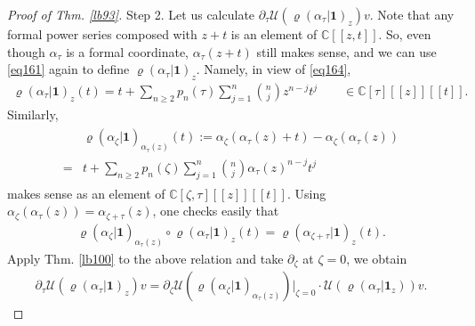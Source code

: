 \documentclass[12pt,a4paper,notitlepage]{article}
\theoremstyle{definition}
\theoremstyle{plain}
\newcommand{\mc}{\mathcal}
\newcommand{\id}{\mathbf{1}}
\newcommand{\Cbb}{\mathbb C}
\numberwithin{equation}{section}
\begin{document}
\begin{proof}[Proof of Thm. \ref{lb93}]
Step 2. Let us calculate $\partial_\tau \mc U(\varrho(\alpha_\tau|\id)_z)v$. Note that any formal power series composed with $z+t$ is an element of $\Cbb[[z,t]]$. So, even though $\alpha_\tau$ is a formal coordinate, $\alpha_\tau(z+t)$ still makes sense, and we can use \eqref{eq161} again to define $\varrho(\alpha_\tau|\id)_z$. Namely, in view of \eqref{eq164},
\begin{align*}
\varrho(\alpha_\tau|\id)_z(t)=t+\sum_{n\geq 2}p_n(\tau)\sum_{j=1}^n{n\choose j}z^{n-j}t^j\qquad \in\Cbb[\tau][[z]][[t]].	
\end{align*}
Similarly, 
\begin{align}\label{eq171}
	\begin{aligned}
&\varrho(\alpha_\zeta|\id)_{\alpha_\tau(z)}(t):=\alpha_\zeta(\alpha_\tau(z)+t)-\alpha_\zeta(\alpha_\tau(z))	\\
=&t+\sum_{n\geq 2}p_n(\zeta)\sum_{j=1}^n{n\choose j}\alpha_\tau(z)^{n-j}t^j
	\end{aligned}
\end{align}
makes sense as an element of $\Cbb[\zeta,\tau][[z]][[t]]$. Using $\alpha_\zeta(\alpha_\tau(z))=\alpha_{\zeta+\tau}(z)$, one checks easily that
\begin{align*}
\varrho(\alpha_\zeta|\id)_{\alpha_\tau(z)}\circ \varrho(\alpha_\tau|\id)_z(t)=\varrho(\alpha_{\zeta+\tau}|\id)_z(t).	
\end{align*}
Apply Thm. \ref{lb100} to the above relation and take $\partial_\zeta$ at $\zeta=0$, we obtain
\begin{align}
\partial_\tau \mc U(\varrho(\alpha_\tau|\id)_z)v=\partial_\zeta\mc U(\varrho(\alpha_\zeta|\id)_{\alpha_\tau(z)})\big|_{\zeta=0}\cdot \mc U(\varrho(\alpha_\tau|\id_z))v.	
\end{align}


\end{proof}
\end{document}
